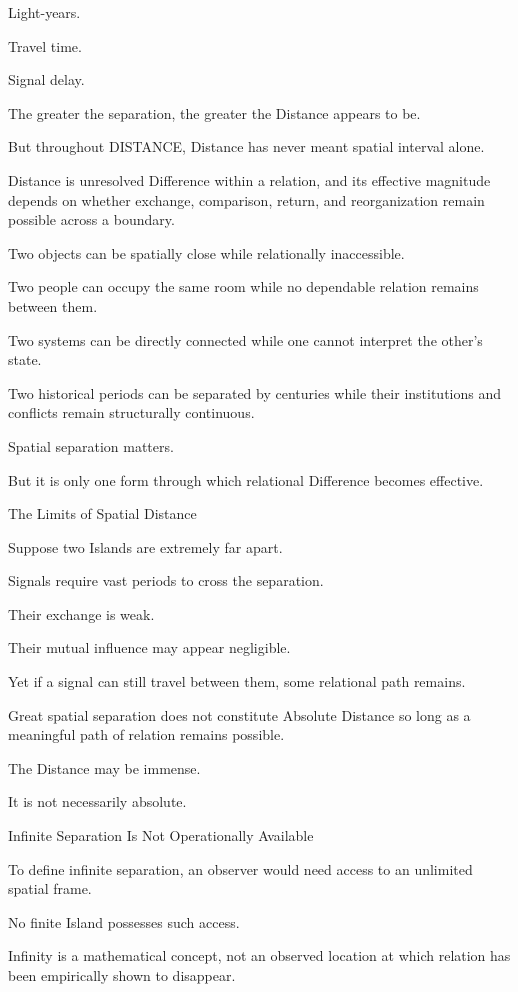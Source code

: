 Light-years.

Travel time.

Signal delay.

The greater the separation, the greater the Distance appears to be.

But throughout DISTANCE, Distance has never meant spatial interval alone.

Distance is unresolved Difference within a relation, and its effective magnitude depends on whether exchange, comparison, return, and reorganization remain possible across a boundary.

Two objects can be spatially close while relationally inaccessible.

Two people can occupy the same room while no dependable relation remains between them.

Two systems can be directly connected while one cannot interpret the other’s state.

Two historical periods can be separated by centuries while their institutions and conflicts remain structurally continuous.

Spatial separation matters.

But it is only one form through which relational Difference becomes effective.

The Limits of Spatial Distance

Suppose two Islands are extremely far apart.

Signals require vast periods to cross the separation.

Their exchange is weak.

Their mutual influence may appear negligible.

Yet if a signal can still travel between them, some relational path remains.

Great spatial separation does not constitute Absolute Distance so long as a meaningful path of relation remains possible.

The Distance may be immense.

It is not necessarily absolute.

Infinite Separation Is Not Operationally Available

To define infinite separation, an observer would need access to an unlimited spatial frame.

No finite Island possesses such access.

Infinity is a mathematical concept, not an observed location at which relation has been empirically shown to disappear.

